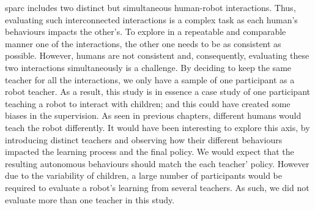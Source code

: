 \gls{sparc} includes two distinct but simultaneous human-robot interactions. Thus, evaluating such interconnected interactions is a complex task as each human's behaviours impacts the other's. To explore in a repeatable and comparable manner one of the interactions, the other one needs to be as consistent as possible. However, humans are not consistent and, consequently, evaluating these two interactions simultaneously is a challenge. By deciding to keep the same teacher for all the interactions, we only have a sample of one participant as a robot teacher. As a result, this study is in essence a case study of one participant teaching a robot to interact with children; and this could have created some biases in the supervision. As seen in previous chapters, different humans would teach the robot differently. It would have been interesting to explore this axis, by introducing distinct teachers and observing how their different behaviours impacted the learning process and the final policy. We would expect that the resulting autonomous behaviours should match the each teacher' policy. However due to the variability of children, a large number of participants would be required to evaluate a robot's learning from several teachers. As such, we did not evaluate more than one teacher in this study.
%


